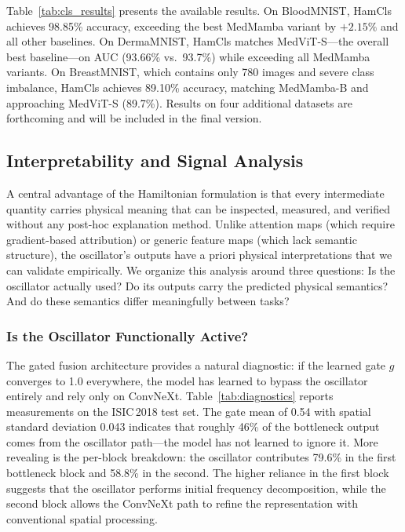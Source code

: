 \documentclass[11pt]{article}
\begin{document}
Table~\ref{tab:cls_results} presents the available results. On BloodMNIST, HamCls achieves 98.85\% accuracy, exceeding the best MedMamba variant by $+2.15\%$ and all other baselines. On DermaMNIST, HamCls matches MedViT-S---the overall best baseline---on AUC (93.66\% vs.\ 93.7\%) while exceeding all MedMamba variants. On BreastMNIST, which contains only 780 images and severe class imbalance, HamCls achieves 89.10\% accuracy, matching MedMamba-B and approaching MedViT-S (89.7\%). Results on four additional datasets are forthcoming and will be included in the final version.


\subsection{Interpretability and Signal Analysis}
\label{sec:vis}

A central advantage of the Hamiltonian formulation is that every intermediate quantity carries physical meaning that can be inspected, measured, and verified without any post-hoc explanation method. Unlike attention maps (which require gradient-based attribution) or generic feature maps (which lack semantic structure), the oscillator's outputs have a priori physical interpretations that we can validate empirically. We organize this analysis around three questions: Is the oscillator actually used? Do its outputs carry the predicted physical semantics? And do these semantics differ meaningfully between tasks?

\subsubsection{Is the Oscillator Functionally Active?}

The gated fusion architecture provides a natural diagnostic: if the learned gate $g$ converges to 1.0 everywhere, the model has learned to bypass the oscillator entirely and rely only on ConvNeXt. Table~\ref{tab:diagnostics} reports measurements on the ISIC\,2018 test set. The gate mean of 0.54 with spatial standard deviation 0.043 indicates that roughly 46\% of the bottleneck output comes from the oscillator path---the model has not learned to ignore it. More revealing is the per-block breakdown: the oscillator contributes 79.6\% in the first bottleneck block and 58.8\% in the second. The higher reliance in the first block suggests that the oscillator performs initial frequency decomposition, while the second block allows the ConvNeXt path to refine the representation with conventional spatial processing.
\end{document}
